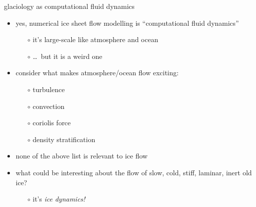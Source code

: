 \begin{frame}{glaciology as computational fluid dynamics}

\begin{itemize}
\item \alert{yes}, numerical ice sheet flow modelling is ``computational fluid dynamics''
  \begin{itemize}
  \item[$\circ$] it's large-scale like atmosphere and ocean
  \item[$\circ$] \dots\, but it is a weird one
  \end{itemize}
\item consider what makes atmosphere/ocean flow exciting:
  \begin{itemize}
  \item[$\circ$] turbulence
  \item[$\circ$] convection
  \item[$\circ$] coriolis force
  \item[$\circ$] density stratification
  \end{itemize}
\item none of the above list is relevant to ice flow
\item what could be interesting about the flow of slow, cold, stiff, laminar, inert old ice?
  \begin{itemize}
  \item[$\circ$] it's \emph{ice dynamics!}
  \end{itemize}
\end{itemize}
\end{frame}


